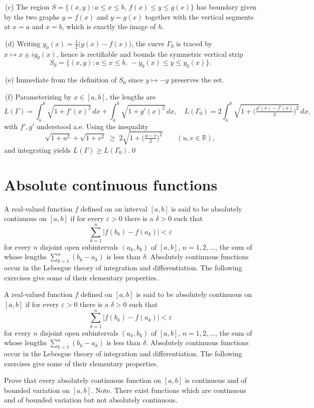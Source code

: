 \,(c) The region $S=\{(x,y): a\le x\le b,\ f(x)\le y\le g(x)\}$ has boundary given by the two graphs $y=f(x)$ and $y=g(x)$ together with the vertical segments at $x=a$ and $x=b$, which is exactly the image of $h$.

\,(d) Writing $y_0(x)=\tfrac12\big(g(x)-f(x)\big)$, the curve $\Gamma_0$ is traced by $x\mapsto x\pm i y_0(x)$, hence is rectifiable and bounds the symmetric vertical strip
\[S_0=\{(x,y): a\le x\le b,\ -y_0(x)\le y\le y_0(x)\}.\]

\,(e) Immediate from the definition of $S_0$ since $y\mapsto -y$ preserves the set.

\,(f) Parameterizing by $x\in[a,b]$, the lengths are
\[L(\Gamma)=\int_a^b\!\sqrt{1+f'(x)^2}\,dx+\int_a^b\!\sqrt{1+g'(x)^2}\,dx,\quad L(\Gamma_0)=2\int_a^b\!\sqrt{1+\Big(\tfrac{g'(x)-f'(x)}{2}\Big)^{\!2}}\,dx,
\]
with $f',g'$ understood a.e. Using the inequality
\[\sqrt{1+u^2}+\sqrt{1+v^2}\;\ge\;2\sqrt{1+\Big(\tfrac{u-v}{2}\Big)^{\!2}}\qquad(u,v\in\mathbb{R}),\]
and integrating yields $L(\Gamma)\ge L(\Gamma_0)$.\qed
\section{Absolute continuous functions}
A real-valued function $f$ defined on an interval $[a,b]$ is said to be absolutely continuous on $[a,b]$ if for every $\varepsilon > 0$ there is a $\delta > 0$ such that
\[\sum_{k=1}^{n} |f(b_k) - f(a_k)| < \varepsilon\]
for every $n$ disjoint open subintervals $(a_k, b_k)$ of $[a, b]$, $n = 1, 2, \ldots$, the sum of whose lengths $\sum_{k=1}^{n} (b_k - a_k)$ is less than $\delta$.
Absolutely continuous functions occur in the Lebesgue theory of integration and differentiation. The following exercises give some of their elementary properties.



\begin{problembox}
A real-valued function $f$ defined on $[a, b]$ is said to be absolutely continuous on $[a, b]$ if for every $\varepsilon > 0$ there is a $\delta > 0$ such that
\[\sum_{k=1}^{n} |f(b_k) - f(a_k)| < \varepsilon\]
for every $n$ disjoint open subintervals $(a_k, b_k)$ of $[a, b]$, $n = 1, 2, \ldots$, the sum of whose lengths $\sum_{k=1}^{n} (b_k - a_k)$ is less than $\delta$. Absolutely continuous functions occur in the Lebesgue theory of integration and differentiation. The following exercises give some of their elementary properties.

Prove that every absolutely continuous function on $[a, b]$ is continuous and of bounded variation on $[a, b]$. Note. There exist functions which are continuous and of bounded variation but not absolutely continuous.
\end{problembox}

